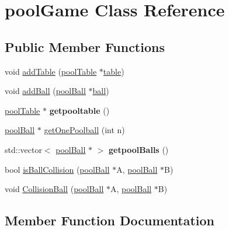 \hypertarget{classpool_game}{}\section{pool\+Game Class Reference}
\label{classpool_game}
\subsection*{Public Member Functions}
\begin{DoxyCompactItemize}
\item 
void \mbox{\hyperlink{classpool_game_a2f5550cf716aacfd50995fb73cb6602f}{add\+Table}} (\mbox{\hyperlink{classpool_table}{pool\+Table}} $\ast$\mbox{\hyperlink{classtable}{table}})
\item 
void \mbox{\hyperlink{classpool_game_a15f39114d5ee90d98521c01ab0f61f93}{add\+Ball}} (\mbox{\hyperlink{classpool_ball}{pool\+Ball}} $\ast$\mbox{\hyperlink{classball}{ball}})
\item 
\mbox{\label{classpool_game_a3493923000e44ff21712f1fbb0f159f6}} 
\mbox{\hyperlink{classpool_table}{pool\+Table}} $\ast$ {\bfseries getpooltable} ()
\item 
\mbox{\hyperlink{classpool_ball}{pool\+Ball}} $\ast$ \mbox{\hyperlink{classpool_game_ae1c3bfe159dca6d35cf447ba634fbfea}{get\+One\+Poolball}} (int n)
\item 
\mbox{\label{classpool_game_a7fbf9126542caa46842d3ece276cb014}} 
std\+::vector$<$ \mbox{\hyperlink{classpool_ball}{pool\+Ball}} $\ast$ $>$ {\bfseries getpool\+Balls} ()
\item 
bool \mbox{\hyperlink{classpool_game_a171207b2803656237a241d30843bf883}{is\+Ball\+Collision}} (\mbox{\hyperlink{classpool_ball}{pool\+Ball}} $\ast$A, \mbox{\hyperlink{classpool_ball}{pool\+Ball}} $\ast$B)
\item 
void \mbox{\hyperlink{classpool_game_a2b907f407d0de6644271b4e1a66a4f3c}{Collision\+Ball}} (\mbox{\hyperlink{classpool_ball}{pool\+Ball}} $\ast$A, \mbox{\hyperlink{classpool_ball}{pool\+Ball}} $\ast$B)
\end{DoxyCompactItemize}


\subsection{Member Function Documentation}
\mbox{\label{classpool_game_a15f39114d5ee90d98521c01ab0f61f93}} 
